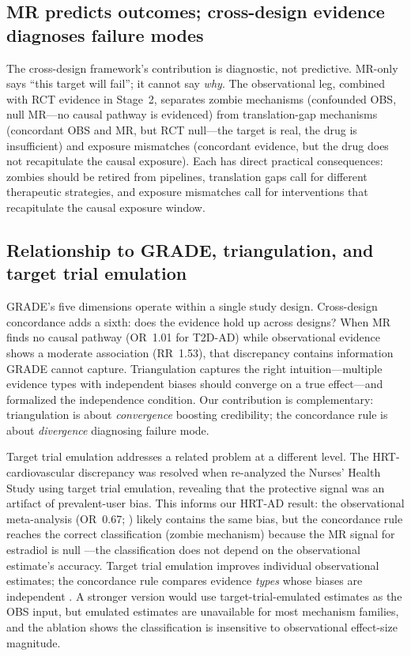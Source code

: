 \documentclass[11pt]{article}
\begin{document}
\subsection{MR predicts outcomes; cross-design evidence diagnoses failure modes}

The cross-design framework's contribution is diagnostic, not predictive. MR-only says ``this target will fail''; it cannot say \emph{why}. The observational leg, combined with RCT evidence in Stage~2, separates zombie mechanisms (confounded OBS, null MR---no causal pathway is evidenced) from translation-gap mechanisms (concordant OBS and MR, but RCT null---the target is real, the drug is insufficient) and exposure mismatches (concordant evidence, but the drug does not recapitulate the causal exposure). Each has direct practical consequences: zombies should be retired from pipelines, translation gaps call for different therapeutic strategies, and exposure mismatches call for interventions that recapitulate the causal exposure window.

\subsection{Relationship to GRADE, triangulation, and target trial emulation}

GRADE's five dimensions operate within a single study design. Cross-design concordance adds a sixth: does the evidence hold up across designs? When MR finds no causal pathway (OR~1.01 for T2D-AD) while observational evidence shows a moderate association (RR~1.53), that discrepancy contains information GRADE cannot capture. Triangulation \cite{lawlor2016,munafo2018} captures the right intuition---multiple evidence types with independent biases should converge on a true effect---and \citet{hammerton2021} formalized the independence condition. Our contribution is complementary: triangulation is about \emph{convergence} boosting credibility; the concordance rule is about \emph{divergence} diagnosing failure mode.

Target trial emulation \cite{hernan2016} addresses a related problem at a different level. The HRT-cardiovascular discrepancy was resolved when \citet{hernan2008} re-analyzed the Nurses' Health Study using target trial emulation, revealing that the protective signal was an artifact of prevalent-user bias. This informs our HRT-AD result: the observational meta-analysis (OR~0.67; \cite{song2020}) likely contains the same bias, but the concordance rule reaches the correct classification (zombie mechanism) because the MR signal for estradiol is null \cite{barth2025}---the classification does not depend on the observational estimate's accuracy. Target trial emulation improves individual observational estimates; the concordance rule compares evidence \emph{types} whose biases are independent \cite{daveysmith2014,gill2024pitfalls,munafo2018}. A stronger version would use target-trial-emulated estimates as the OBS input, but emulated estimates are unavailable for most mechanism families, and the ablation shows the classification is insensitive to observational effect-size magnitude.
\end{document}
